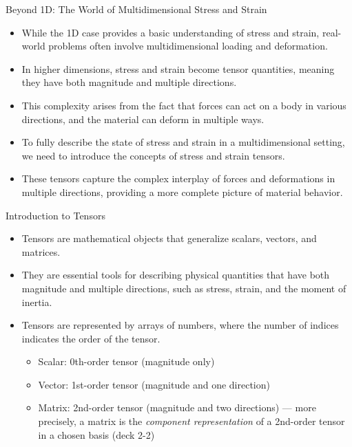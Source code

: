 \documentclass{beamer}
\begin{document}
\begin{frame}{Beyond 1D: The World of Multidimensional Stress and Strain}
    \begin{itemize}
        \item While the 1D case provides a basic understanding of stress and strain, real-world problems often involve multidimensional loading and deformation.
        \item In higher dimensions, stress and strain become tensor quantities, meaning they have both magnitude and multiple directions.
        \item This complexity arises from the fact that forces can act on a body in various directions, and the material can deform in multiple ways.
        \item To fully describe the state of stress and strain in a multidimensional setting, we need to introduce the concepts of stress and strain tensors.
        \item These tensors capture the complex interplay of forces and deformations in multiple directions, providing a more complete picture of material behavior.
    \end{itemize}
\end{frame}

\begin{frame}{Introduction to Tensors}
    \begin{itemize}
        \item Tensors are mathematical objects that generalize scalars, vectors, and matrices.
        \item They are essential tools for describing physical quantities that have both magnitude and multiple directions, such as stress, strain, and the moment of inertia.
        \item Tensors are represented by arrays of numbers, where the number of indices indicates the order of the tensor.
        \begin{itemize}
            \item Scalar: 0th-order tensor (magnitude only)
            \item Vector: 1st-order tensor (magnitude and one direction)
            \item Matrix: 2nd-order tensor (magnitude and two directions) --- more precisely, a matrix is the \emph{component representation} of a 2nd-order tensor in a chosen basis (deck 2-2)
        \end{itemize}
    \end{itemize}
\end{frame}
\end{document}
